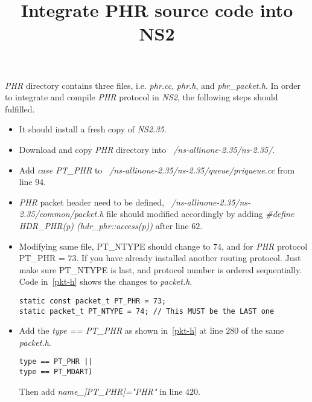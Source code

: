 \documentclass{article}
\begin{document}
               


\title{Integrate PHR source code into NS2}

\emph{PHR} directory contains three files, i.e. \emph{phr.cc}, \emph{phr.h}, \emp	 and \emph{phr\_packet.h}.
In order to integrate and compile \emph{PHR} protocol in \emph{NS2}, the following steps should fulfilled.

\begin{itemize}
\item It should install a fresh copy of \emph{NS2.35}.
\item Download and copy \emph{PHR} directory into \emph{~/ns-allinone-2.35/ns-2.35/}.
\item Add \emph{case PT\_PHR} to \emph{~/ns-allinone-2.35/ns-2.35/queue/priqueue.cc} from line $94$.
\item \emph{PHR} packet header need to be defined, \emph{~/ns-allinone-2.35/ns-2.35/common/packet.h} file
should modified accordingly by adding \emph{\#define HDR\_PHR(p)      (hdr\_phr::access(p))} after line $62$.

\item Modifying same file, PT\_NTYPE should change to $74$, and for \emph{PHR} protocol PT\_PHR = $73$. 
If you have already installed another routing protocol. Just make sure PT\_NTYPE is last, and protocol number is ordered 
sequentially. Code in~\ref{pkt-h} shows the changes to \emph{packet.h}.

\lstset{language=C++}
\begin{lstlisting}[caption= Packet header file changes \label{pkt-h} ,float]
static const packet_t PT_PHR = 73;
static packet_t PT_NTYPE = 74; // This MUST be the LAST one
\end{lstlisting}

\item Add the \emph{type == PT\_PHR} as shown in~\ref{pkt-h} at line $280$ of the same \emph{packet.h}.
\begin{lstlisting}[caption= Make packet has high priority \label{pkt-h} ,float]
type == PT_PHR ||  
type == PT_MDART)
\end{lstlisting}
Then add \emph{name\_[PT\_PHR]="PHR"} in line $420$.
  

\end{itemize}
\end{document}
